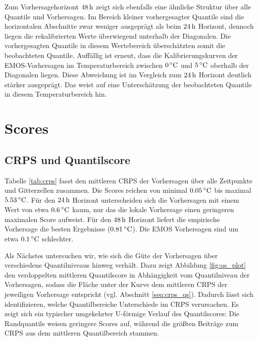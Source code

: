 Zum Vorhersagehorizont $48\,\mathrm{h}$ zeigt sich ebenfalls eine ähnliche Struktur über alle Quantile und Vorhersagen. Im Bereich kleiner vorhergesagter Quantile sind die horizontalen Abschnitte zwar weniger ausgeprägt als beim $24\,\mathrm{h}$ Horizont, dennoch liegen die rekalibrierten Werte überwiegend unterhalb der Diagonalen. Die vorhergesagten Quantile in diesem Wertebereich überschätzten somit die beobachteten Quantile. Auffällig ist erneut, dass die Kalibrierungskurven der EMOS-Vorhersagen im Temperaturbereich zwischen $0\,^\circ\mathrm{C}$ und $5\,^\circ\mathrm{C}$ oberhalb der Diagonalen liegen. Diese Abweichung ist im Vergleich zum $24\,\mathrm{h}$ Horizont deutlich stärker ausgeprägt. Das weist auf eine Unterschätzung der beobachteten Quantile in diesem Temperaturbereich hin.




\FloatBarrier
\section{Scores} \label{sec:res_scores}

\subsection{CRPS und Quantilscore}


Tabelle \ref{tab:crps} fasst den mittleren CRPS der Vorhersagen über alle Zeitpunkte und Gitterzellen zusammen. Die Scores reichen von minimal $0.05\,^\circ\mathrm{C}$ bis maximal $5.53\,^\circ\mathrm{C}$. Für den $24\,\mathrm{h}$ Horizont unterscheiden sich die Vorhersagen mit einem Wert von etwa $0.6\,^\circ\mathrm{C}$ kaum, nur das die lokale Vorhersage einen geringeren maximalen Score aufweist. Für den $48\,\mathrm{h}$ Horizont liefert die empirische Vorhersage die besten Ergebnisse ($0.81\,^\circ\mathrm{C}$). Die EMOS Vorhersagen sind um etwa $0.1\,^\circ\mathrm{C}$ schlechter.



Als Nächstes untersuchen wir, wie sich die Güte der Vorhersagen über verschiedene Quantilniveaus hinweg verhält. Dazu zeigt Abbildung \ref{fig:qs_plot} den verdoppelten mittleren Quantilscore in Abhängigkeit vom Quantilniveau der Vorhersagen, sodass die Fläche unter der Kurve dem mittleren CRPS der jeweiligen Vorhersage entspricht (vgl. Abschnitt \ref{seq:crps_qs}). Dadurch lässt sich identifizieren, welche Quantilbereiche Unterschiede im CRPS verursachen. Es zeigt sich ein typischer umgekehrter U-förmige Verlauf des Quantilscores: Die Randquantile weisen geringere Scores auf, während die größten Beiträge zum CRPS aus dem mittleren Quantilbereich stammen.

